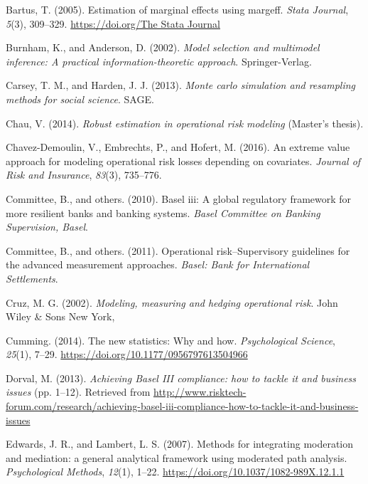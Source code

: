 \documentclass[]{DissertateUSU}
\begin{document}
\hypertarget{ref-Bartus2005}{}
Bartus, T. (2005). Estimation of marginal effects using margeff.
\emph{Stata Journal}, \emph{5}(3), 309--329.
\href{https://doi.org/The\%20Stata\%20Journal}{https://doi.org/The Stata Journal}

\hypertarget{ref-Burnham2002}{}
Burnham, K., and Anderson, D. (2002). \emph{Model selection and
multimodel inference: A practical information-theoretic approach}.
Springer-Verlag.

\hypertarget{ref-Carsey2013}{}
Carsey, T. M., and Harden, J. J. (2013). \emph{Monte carlo simulation
and resampling methods for social science}. SAGE.

\hypertarget{ref-chau2014robust}{}
Chau, V. (2014). \emph{Robust estimation in operational risk modeling}
(Master's thesis).

\hypertarget{ref-chavez2016extreme}{}
Chavez-Demoulin, V., Embrechts, P., and Hofert, M. (2016). An extreme
value approach for modeling operational risk losses depending on
covariates. \emph{Journal of Risk and Insurance}, \emph{83}(3),
735--776.

\hypertarget{ref-basel2010basel}{}
Committee, B., and others. (2010). Basel iii: A global regulatory
framework for more resilient banks and banking systems. \emph{Basel
Committee on Banking Supervision, Basel}.

\hypertarget{ref-basel2011operational}{}
Committee, B., and others. (2011). Operational risk--Supervisory
guidelines for the advanced measurement approaches. \emph{Basel: Bank
for International Settlements}.

\hypertarget{ref-cruz2002modeling}{}
Cruz, M. G. (2002). \emph{Modeling, measuring and hedging operational
risk}. John Wiley \& Sons New York,

\hypertarget{ref-Cumming2014}{}
Cumming. (2014). The new statistics: Why and how. \emph{Psychological
Science}, \emph{25}(1), 7--29.
\url{https://doi.org/10.1177/0956797613504966}

\hypertarget{ref-mysis2013}{}
Dorval, M. (2013). \emph{Achieving Basel III compliance: how to tackle
it and business issues} (pp. 1--12). Retrieved from
\url{http://www.risktech-forum.com/research/achieving-basel-iii-compliance-how-to-tackle-it-and-business-issues}

\hypertarget{ref-Edwards2007}{}
Edwards, J. R., and Lambert, L. S. (2007). Methods for integrating
moderation and mediation: a general analytical framework using moderated
path analysis. \emph{Psychological Methods}, \emph{12}(1), 1--22.
\url{https://doi.org/10.1037/1082-989X.12.1.1}
\end{document}
